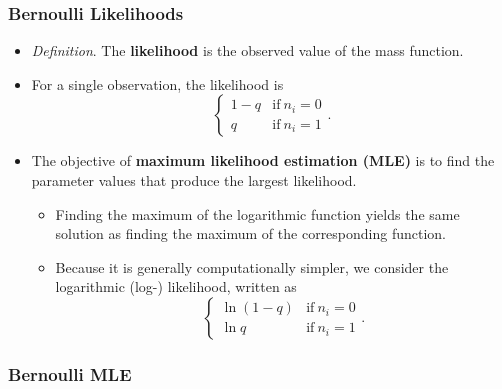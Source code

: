\documentclass[]{book}
\theoremstyle{definition}
\theoremstyle{definition}
\theoremstyle{definition}
\theoremstyle{remark}
\begin{document}
\subsubsection{Bernoulli Likelihoods}\label{bernoulli-likelihoods}

\begin{itemize}
\item
  \emph{Definition}. The \textbf{likelihood} is the observed value of
  the mass function.
\item
  For a single observation, the likelihood is \[\left\{
  \begin{array}{ll}
  1-q & \mathrm{if}\ n_i=0 \\
  q   & \mathrm{if}\ n_i=1
  \end{array}
  \right. .\]
\item
  The objective of \textbf{maximum likelihood estimation (MLE)} is to
  find the parameter values that produce the largest likelihood.

  \begin{itemize}
  \item
    Finding the maximum of the logarithmic function yields the same
    solution as finding the maximum of the corresponding function.
  \item
    Because it is generally computationally simpler, we consider the
    logarithmic (log-) likelihood, written as \[\left\{
    \begin{array}{ll}
    \ln \left( 1-q\right)  & \mathrm{if}\ n_i=0 \\
    \ln     q              & \mathrm{if}\ n_i=1
    \end{array}\right. .\]
  \end{itemize}
\end{itemize}

\subsubsection{Bernoulli MLE}\label{bernoulli-mle}
\end{document}

